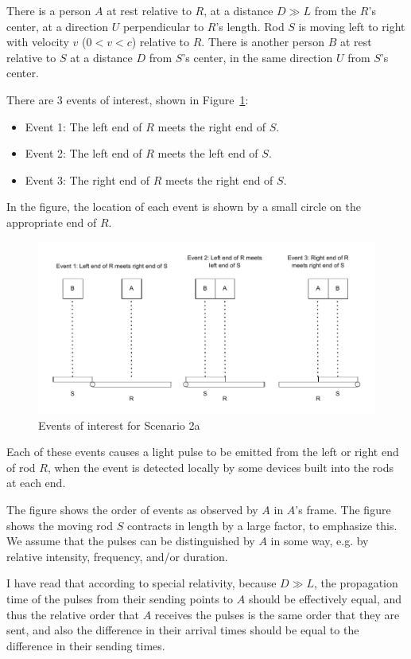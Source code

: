 \documentclass[a4paper]{article}
\theoremstyle{plain}
\theoremstyle{definition}
\begin{document}
There is a person $A$ at rest relative to $R$, at a distance $D \gg L$
from the $R$'s center, at a direction $U$ perpendicular to $R$'s
length.  Rod $S$ is moving left to right with velocity $v$
($0 < v < c$) relative to $R$.  There is another person $B$ at rest
relative to $S$ at a distance $D$ from $S$'s center, in the same
direction $U$ from $S$'s center.

There are 3 events of interest, shown in Figure~\ref{fig:scenario2a-events}:
\begin{itemize}
\item Event 1: The left end of $R$ meets the right end of $S$.
\item Event 2: The left end of $R$ meets the left end of $S$.
\item Event 3: The right end of $R$ meets the right end of $S$.
\end{itemize}
In the figure, the location of each event is shown by a small circle
on the appropriate end of $R$.

\begin{figure}[ht]
	\centering
	\includegraphics[width=1.0\textwidth]{scenario2a-events-cropped.pdf}
	\caption{Events of interest for Scenario 2a}
	\label{fig:scenario2a-events}
\end{figure}

Each of these events causes a light pulse to be emitted from the left
or right end of rod $R$, when the event is detected locally by some
devices built into the rods at each end.

The figure shows the order of events as observed by $A$ in $A$'s
frame.  The figure shows the moving rod $S$ contracts in length by a
large factor, to emphasize this.  We assume that the pulses can be
distinguished by $A$ in some way, e.g. by relative intensity,
frequency, and/or duration.

I have read that according to special relativity, because $D \gg L$,
the propagation time of the pulses from their sending points to $A$
should be effectively equal, and thus the relative order that $A$
receives the pulses is the same order that they are sent, and also the
difference in their arrival times should be equal to the difference in
their sending times.
\end{document}
